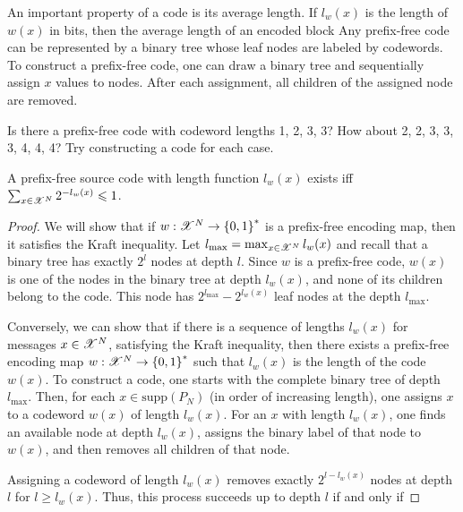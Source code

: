 \documentclass[letterpaper,10pt,english]{article}
\begin{document}
An important property of a code is its average length. 
If $l_w(x)$ is the length of $w(x)$ in bits, then the average length of an encoded block 
Any prefix-free code can be represented by a binary tree whose leaf nodes are labeled by codewords. 
To construct a prefix-free code, one can draw a binary tree and sequentially assign $x$ values to nodes. 
After each assignment, all children of the assigned node are removed.
\begin{exerc} 
Is there a prefix-free code with codeword lengths 1, 2, 3, 3? How about 2, 2, 3, 3, 3, 4, 4, 4? 
Try constructing a code for each case.
\end{exerc}
\begin{lem}  
A prefix-free source code with length function $l_w(x)$ exists iff $\sum_{x \in \mathscr{X}^N}2^{-l_w(x)} \leqslant 1$. 
\end{lem} 
\begin{proof}
We will show that if $w: \mathscr{X}^N \to \left\{0,1\right\}^{\ast}$ is a prefix-free encoding map, then it satisfies the Kraft inequality. 
Let $l_{\max} = \max_{x \in \mathscr{X}^N} l_w(x)$ and recall that a binary tree has exactly $2^l$ nodes at depth $l$. 
Since $w$ is a prefix-free code, $w(x)$ is one of the nodes in the binary tree at depth $l_w(x)$, 
and none of its children belong to the code. 
This node has $2^{l_{\max}}-2^{l_w(x)}$ leaf nodes at the depth $l_{\max}$. 


Conversely,  we can show that if there is a sequence of lengths $l_w(x)$ for messages $x \in \mathscr{X}^N$, satisfying the Kraft inequality, then there exists a prefix-free encoding map $w: \mathscr{X}^N \to \left\{0,1\right\}^{\ast}$ such that $l_w(x)$ is the length of the code $w(x)$. 
To construct a code, one starts with the complete binary tree of depth $l_{\max}$. 
Then, for each $x \in \text{supp}(P_N)$ (in order of increasing length), one assigns $x$ to a codeword $w(x)$ of length $l_w(x)$. 
For an $x$ with length $l_w(x)$, one finds an available node at depth $l_w(x)$, assigns the binary label of that node to $w(x)$, 
and then removes all children of that node. 


Assigning a codeword of length $l_w(x)$ removes exactly $2^{l-l_w(x)}$ nodes at depth $l$ for $l \ge l_w(x)$. 
Thus, this process succeeds up to depth $l$ if and only if 
\end{proof}
\end{document}
